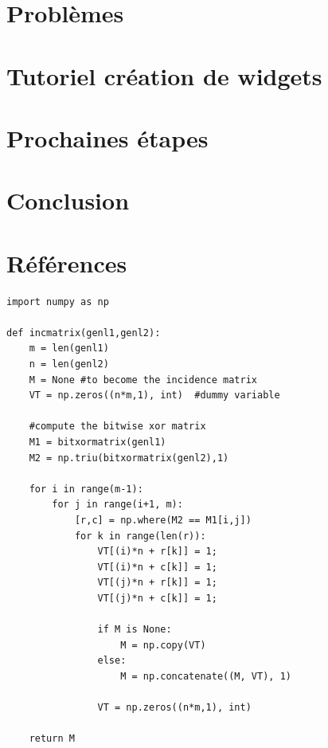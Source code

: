 \documentclass{article}
\begin{document}
\section{Problèmes}

\section{Tutoriel création de widgets}

\section{Prochaines étapes}

\section{Conclusion}

\section{Références}

\begin{verbatim}
import numpy as np
    
def incmatrix(genl1,genl2):
    m = len(genl1)
    n = len(genl2)
    M = None #to become the incidence matrix
    VT = np.zeros((n*m,1), int)  #dummy variable
    
    #compute the bitwise xor matrix
    M1 = bitxormatrix(genl1)
    M2 = np.triu(bitxormatrix(genl2),1) 

    for i in range(m-1):
        for j in range(i+1, m):
            [r,c] = np.where(M2 == M1[i,j])
            for k in range(len(r)):
                VT[(i)*n + r[k]] = 1;
                VT[(i)*n + c[k]] = 1;
                VT[(j)*n + r[k]] = 1;
                VT[(j)*n + c[k]] = 1;
                
                if M is None:
                    M = np.copy(VT)
                else:
                    M = np.concatenate((M, VT), 1)
                
                VT = np.zeros((n*m,1), int)
    
    return M
\end{verbatim}



\end{document}
